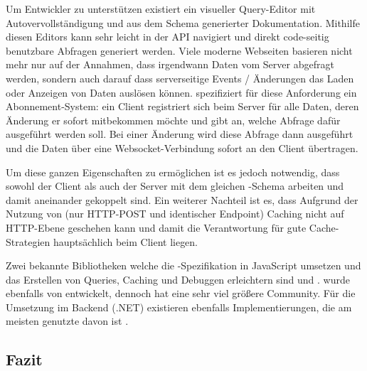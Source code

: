 

Um Entwickler zu unterstützen existiert ein visueller Query-Editor  mit Autovervollständigung und aus dem Schema generierter Dokumentation. Mithilfe diesen Editors kann sehr leicht in der API navigiert und direkt code-seitig benutzbare Abfragen generiert werden.
Viele moderne Webseiten basieren nicht mehr nur auf der Annahmen, dass irgendwann Daten vom Server abgefragt werden, sondern auch darauf dass serverseitige Events / Änderungen das Laden oder Anzeigen von Daten auslösen können.  spezifiziert für diese Anforderung ein Abonnement-System: ein Client registriert sich beim Server für alle Daten, deren Änderung er sofort mitbekommen möchte und gibt an, welche Abfrage dafür ausgeführt werden soll. Bei einer Änderung wird diese Abfrage dann ausgeführt und die Daten über eine Websocket-Verbindung sofort an den Client übertragen.

Um diese ganzen Eigenschaften zu ermöglichen ist es jedoch notwendig, dass sowohl der Client als auch der Server mit dem gleichen -Schema arbeiten und damit aneinander gekoppelt sind.
Ein weiterer Nachteil ist es, dass Aufgrund der Nutzung von  (nur HTTP-POST und identischer Endpoint) Caching nicht auf HTTP-Ebene geschehen kann und damit die Verantwortung für gute Cache-Strategien hauptsächlich beim Client liegen.

Zwei bekannte Bibliotheken welche die -Spezifikation in JavaScript umsetzen und das Erstellen von Queries, Caching und Debuggen erleichtern sind  und .  wurde ebenfalls von  entwickelt, dennoch hat  eine sehr viel größere Community. Für die Umsetzung im Backend (.NET) existieren ebenfalls Implementierungen, die am meisten genutzte davon ist .

\subsection{Fazit}

